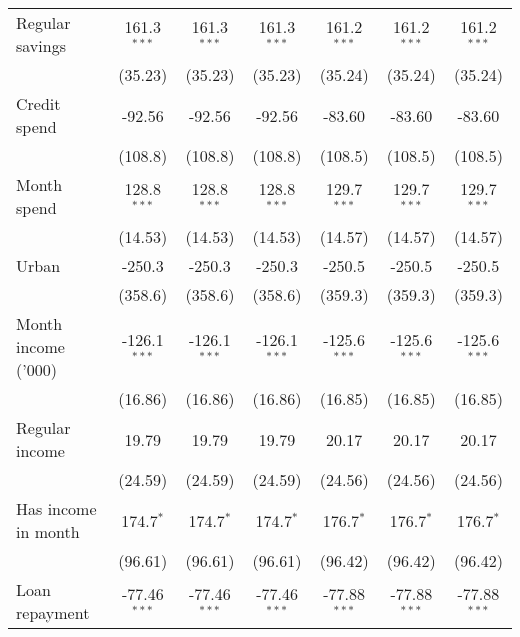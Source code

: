 \begin{table}[htbp]
\begin{footnotesize}
\begin{tabular}{lcccccc}
         Regular savings             & 161.3$^{***}$  & 161.3$^{***}$  & 161.3$^{***}$  & 161.2$^{***}$  & 161.2$^{***}$  & 161.2$^{***}$\\
                                     & (35.23)        & (35.23)        & (35.23)        & (35.24)        & (35.24)        & (35.24)\\
         Credit spend                & -92.56         & -92.56         & -92.56         & -83.60         & -83.60         & -83.60\\
                                     & (108.8)        & (108.8)        & (108.8)        & (108.5)        & (108.5)        & (108.5)\\
         Month spend                 & 128.8$^{***}$  & 128.8$^{***}$  & 128.8$^{***}$  & 129.7$^{***}$  & 129.7$^{***}$  & 129.7$^{***}$\\
                                     & (14.53)        & (14.53)        & (14.53)        & (14.57)        & (14.57)        & (14.57)\\
         Urban                       & -250.3         & -250.3         & -250.3         & -250.5         & -250.5         & -250.5\\
                                     & (358.6)        & (358.6)        & (358.6)        & (359.3)        & (359.3)        & (359.3)\\
         Month income ('000)         & -126.1$^{***}$ & -126.1$^{***}$ & -126.1$^{***}$ & -125.6$^{***}$ & -125.6$^{***}$ & -125.6$^{***}$\\
                                     & (16.86)        & (16.86)        & (16.86)        & (16.85)        & (16.85)        & (16.85)\\
         Regular income              & 19.79          & 19.79          & 19.79          & 20.17          & 20.17          & 20.17\\
                                     & (24.59)        & (24.59)        & (24.59)        & (24.56)        & (24.56)        & (24.56)\\
         Has income in month         & 174.7$^{*}$    & 174.7$^{*}$    & 174.7$^{*}$    & 176.7$^{*}$    & 176.7$^{*}$    & 176.7$^{*}$\\
                                     & (96.61)        & (96.61)        & (96.61)        & (96.42)        & (96.42)        & (96.42)\\
         Loan repayment              & -77.46$^{***}$ & -77.46$^{***}$ & -77.46$^{***}$ & -77.88$^{***}$ & -77.88$^{***}$ & -77.88$^{***}$\\

\end{tabular}
\end{footnotesize}
\end{table}

